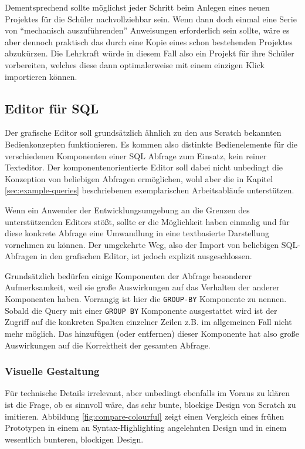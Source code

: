 Dementsprechend sollte möglichst jeder Schritt beim Anlegen eines neuen Projektes für die Schüler nachvollziehbar sein. Wenn dann doch einmal eine Serie von ``mechanisch auszuführenden'' Anweisungen erforderlich sein sollte, wäre es aber dennoch praktisch das durch eine Kopie eines schon bestehenden Projektes abzukürzen. Die Lehrkraft würde in diesem Fall also ein Projekt für ihre Schüler vorbereiten, welches diese dann optimalerweise mit einem einzigen Klick importieren können.

\subsection{Editor für SQL}
\label{sec:design-sql-editor}

Der grafische Editor soll grundsätzlich ähnlich zu den aus Scratch bekannten Bedienkonzepten funktionieren. Es kommen also distinkte Bedienelemente für die verschiedenen Komponenten einer SQL Abfrage zum Einsatz, kein reiner Texteditor. Der komponentenorientierte Editor soll dabei nicht unbedingt die Konzeption von beliebigen Abfragen ermöglichen, wohl aber die in Kapitel \ref{sec:example-queries}  beschriebenen exemplarischen Arbeitsabläufe unterstützen. 

Wenn ein Anwender der Entwicklungsumgebung an die Grenzen des unterstützenden Editors stößt, sollte er die Möglichkeit haben einmalig und für diese konkrete Abfrage eine Umwandlung in eine textbasierte Darstellung vornehmen zu können. Der umgekehrte Weg, also der Import von beliebigen SQL-Abfragen in den grafischen Editor, ist jedoch explizit ausgeschlossen.

Grundsätzlich bedürfen einige Komponenten der Abfrage besonderer Aufmerksamkeit, weil sie große Auswirkungen auf das Verhalten der anderer Komponenten haben. Vorrangig ist hier die \texttt{GROUP-BY} Komponente zu nennen. Sobald die Query mit einer \texttt{GROUP BY} Komponente ausgestattet wird ist der Zugriff auf die konkreten Spalten einzelner Zeilen z.B. im allgemeinen Fall nicht mehr möglich. Das hinzufügen (oder entfernen) dieser Komponente hat also große Auswirkungen auf die Korrektheit der gesamten Abfrage.

\subsubsection{Visuelle Gestaltung}

Für technische Details irrelevant, aber unbedingt ebenfalls im Voraus zu klären ist die Frage, ob es sinnvoll wäre, das sehr bunte, blockige Design von Scratch zu imitieren. Abbildung \ref{fig:compare-colourful} zeigt einen Vergleich eines frühen Prototypen in einem an Syntax-Highlighting angelehnten Design und in einem wesentlich bunteren, blockigen Design.

